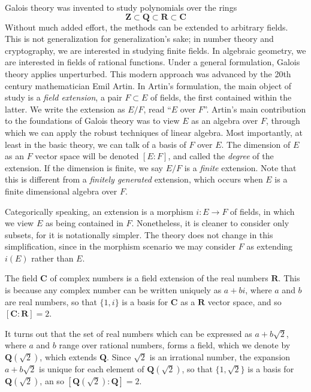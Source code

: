 Galois theory was invented to study polynomials over the rings
%
\[ \mathbf{Z} \subset \mathbf{Q} \subset \mathbf{R} \subset \mathbf{C} \]
%
Without much added effort, the methods can be extended to arbitrary fields. This is not generalization for generalization's sake; in number theory and cryptography, we are interested in studying finite fields. In algebraic geometry, we are interested in fields of rational functions. Under a general formulation, Galois theory applies unperturbed. This modern approach was advanced by the 20th century mathematician Emil Artin. In Artin's formulation, the main object of study is a {\it field extension}, a pair $F \subset E$ of fields, the first contained within the latter. We write the extension as $E/F$, read ``$E$ over $F$''. Artin's main contribution to the foundations of Galois theory was to view $E$ as an algebra over $F$, through which we can apply the robust techniques of linear algebra. Most importantly, at least in the basic theory, we can talk of a basis of $F$ over $E$. The dimension of $E$ as an $F$ vector space will be denoted $[E:F]$, and called the {\it degree} of the extension. If the dimension is finite, we say $E/F$ is a {\it finite} extension. Note that this is different from a {\it finitely generated} extension, which occurs when $E$ is a finite dimensional algebra over $F$.

\begin{remark}
	Categorically speaking, an extension is a morphism $i: E \to F$ of fields, in which we view $E$ as being contained in $F$. Nonetheless, it is cleaner to consider only subsets, for it is notationally simpler. The theory does not change in this simplification, since in the morphism scenario we may consider $F$ as extending $i(E)$ rather than $E$.
\end{remark}

\begin{example}
    The field $\mathbf{C}$ of complex numbers is a field extension of the real numbers $\mathbf{R}$. This is because any complex number can be written uniquely as $a + bi$, where $a$ and $b$ are real numbers, so that $\{ 1, i \}$ is a basis for $\mathbf{C}$ as a $\mathbf{R}$ vector space, and so $[\mathbf{C}: \mathbf{R}] = 2$.
\end{example}

\begin{example}
	It turns out that the set of real numbers which can be expressed as $a + b \sqrt{2}$, where $a$ and $b$ range over rational numbers, forms a field, which we denote by $\mathbf{Q}(\sqrt{2})$, which extends $\mathbf{Q}$. Since $\sqrt{2}$ is an irrational number, the expansion $a + b \sqrt{2}$ is unique for each element of $\mathbf{Q}(\sqrt{2})$, so that $\{ 1, \sqrt{2} \}$ is a basis for $\mathbf{Q}(\sqrt{2})$, an so $[\mathbf{Q}(\sqrt{2}): \mathbf{Q}] = 2$.
\end{example}

